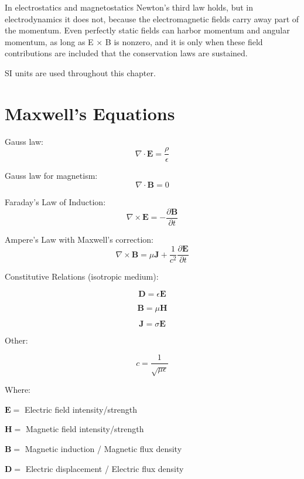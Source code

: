 \documentclass[english]{book}
\begin{document}
In electrostatics and magnetostatics Newton's third law holds, but in electrodynamics it does not, because the electromagnetic fields carry away part of the momentum. Even perfectly static fields can harbor momentum and angular momentum, as long as E × B is nonzero, and it is only when these field contributions are included that the conservation laws are sustained.

SI units are used throughout this chapter.


\section{Maxwell's Equations}

Gauss law:
\begin{equation}
\nabla\cdot\mathbf{E}=\frac{\rho}{\epsilon}    \label{eq:lawCoulomb}
\end{equation}

Gauss law for magnetism:
\begin{equation}
\nabla\cdot\mathbf{B}=0        \label{eq:lawGauss}
\end{equation}

Faraday's Law of Induction:
\begin{equation}
\nabla\times\mathbf{E}=-\frac{\partial\mathbf{B}}{\partial t}    \label{eq:lawFaraday}
\end{equation}

Ampere's Law with Maxwell's correction:
\begin{equation}
\nabla\times\mathbf{B}=\mu\mathbf{J}+\frac{1}{c^{2}}\frac{\partial\mathbf{E}}{\partial t}        \label{eq:lawAmpere}
\end{equation}

Constitutive Relations (isotropic medium):

\[ \mathbf{D} = \epsilon \mathbf{E} \]

\[ \mathbf{B} = \mu \mathbf{H} \]

\[ \mathbf{J} = \sigma \mathbf{E} \]

Other:

\[ c = \frac{1}{\sqrt{\mu \epsilon}}\]

Where:

$\mathbf{E} =$ Electric field intensity/strength

$\mathbf{H} =$ Magnetic field intensity/strength

$\mathbf{B} =$ Magnetic induction / Magnetic flux density

$\mathbf{D} =$ Electric displacement / Electric flux density
\end{document}
